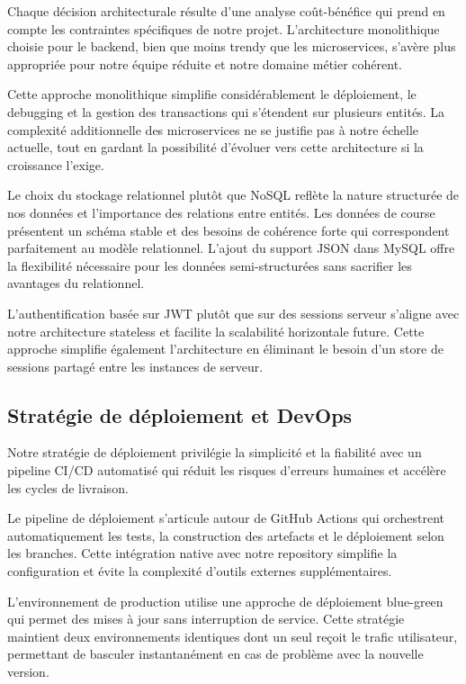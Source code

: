 Chaque décision architecturale résulte d'une analyse coût-bénéfice qui prend en compte les contraintes spécifiques de notre projet. L'architecture monolithique choisie pour le backend, bien que moins trendy que les microservices, s'avère plus appropriée pour notre équipe réduite et notre domaine métier cohérent.

Cette approche monolithique simplifie considérablement le déploiement, le debugging et la gestion des transactions qui s'étendent sur plusieurs entités. La complexité additionnelle des microservices ne se justifie pas à notre échelle actuelle, tout en gardant la possibilité d'évoluer vers cette architecture si la croissance l'exige.

Le choix du stockage relationnel plutôt que NoSQL reflète la nature structurée de nos données et l'importance des relations entre entités. Les données de course présentent un schéma stable et des besoins de cohérence forte qui correspondent parfaitement au modèle relationnel. L'ajout du support JSON dans MySQL offre la flexibilité nécessaire pour les données semi-structurées sans sacrifier les avantages du relationnel.

L'authentification basée sur JWT plutôt que sur des sessions serveur s'aligne avec notre architecture stateless et facilite la scalabilité horizontale future. Cette approche simplifie également l'architecture en éliminant le besoin d'un store de sessions partagé entre les instances de serveur.

\subsection{Stratégie de déploiement et DevOps}

Notre stratégie de déploiement privilégie la simplicité et la fiabilité avec un pipeline CI/CD automatisé qui réduit les risques d'erreurs humaines et accélère les cycles de livraison.

Le pipeline de déploiement s'articule autour de GitHub Actions qui orchestrent automatiquement les tests, la construction des artefacts et le déploiement selon les branches. Cette intégration native avec notre repository simplifie la configuration et évite la complexité d'outils externes supplémentaires.

L'environnement de production utilise une approche de déploiement blue-green qui permet des mises à jour sans interruption de service. Cette stratégie maintient deux environnements identiques dont un seul reçoit le trafic utilisateur, permettant de basculer instantanément en cas de problème avec la nouvelle version.

